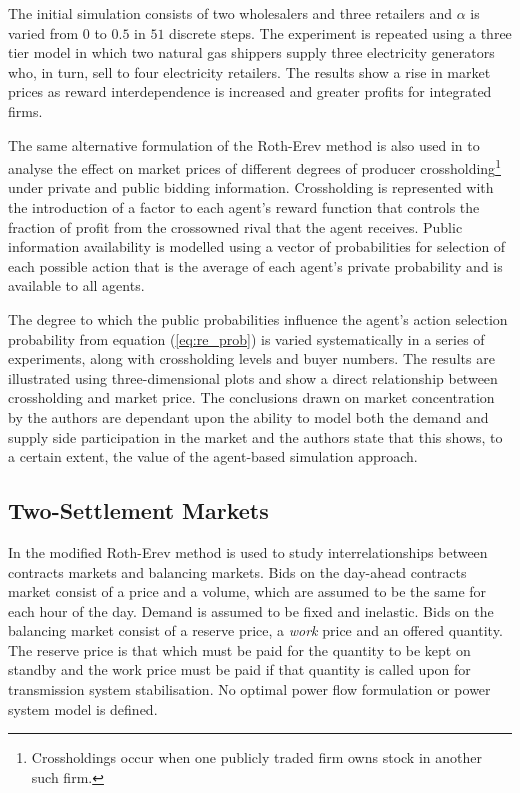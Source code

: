 The initial simulation consists of two wholesalers and three retailers and
$\alpha$ is varied from $0$ to $0.5$ in $51$ discrete steps.  The experiment
is repeated using a three tier model in which two natural gas shippers supply
three electricity generators who, in turn, sell to four electricity retailers.
The results show a rise in market prices as reward interdependence is
increased and greater profits for integrated firms.

The same alternative formulation of the Roth-Erev method is also used in
 to analyse the effect on market prices of different degrees
of producer crossholding\footnote{Crossholdings occur when one publicly
traded firm owns stock in another such firm.} under private and public bidding
information.  Crossholding is represented with the introduction of a factor
to each agent's reward function that controls the fraction of profit from
the crossowned rival that the agent receives.  Public information availability
is modelled using a vector of probabilities for selection of each
possible action that is the average of each agent's private probability and is
available to all agents.

The degree to which the public probabilities
influence the agent's action selection probability from equation (\ref{eq:re_prob}) is varied
systematically in a series of experiments, along with crossholding levels and
buyer numbers.  The results are illustrated using three-dimensional
plots and show a direct relationship between crossholding and market price.
The conclusions drawn on market concentration by the authors are dependant upon
the ability to model both the demand and supply side participation in the
market and the authors state that this shows, to a certain extent, the value
of the agent-based simulation approach.

\subsection{Two-Settlement Markets}
In  the modified Roth-Erev method is used to study
interrelationships between contracts markets and balancing markets.  Bids on the
day-ahead contracts market consist of a price and a volume, which are assumed to
be the same for each hour of the day.  Demand is assumed to be fixed and
inelastic.  Bids on the balancing market consist of a reserve price, a
\textit{work} price and an offered quantity.  The reserve price is that which
must be paid for the quantity to be kept on standby and the work price must be
paid if that quantity is called upon for transmission system stabilisation. No
optimal power flow formulation or power system model is defined.

